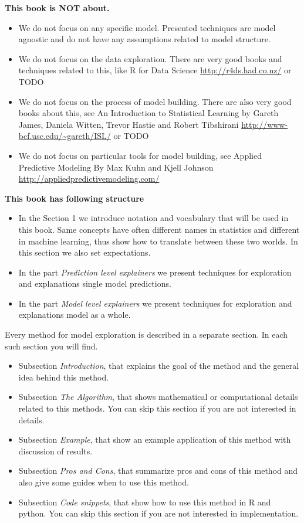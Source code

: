 \documentclass[]{krantz}
\providecommand{\tightlist}{%
  \setlength{\itemsep}{0pt}\setlength{\parskip}{0pt}}
\theoremstyle{definition}
\theoremstyle{definition}
\theoremstyle{definition}
\theoremstyle{remark}
\begin{document}
\textbf{This book is NOT about.}

\begin{itemize}
\tightlist
\item
  We do not focus on any specific model. Presented techniques are model
  agnostic and do not have any assumptions related to model structure.
\item
  We do not focus on the data exploration. There are very good books and
  techniques related to this, like R for Data Science
  \url{http://r4ds.had.co.nz/} or TODO
\item
  We do not focus on the process of model building. There are also very
  good books about this, see An Introduction to Statistical Learning by
  Gareth James, Daniela Witten, Trevor Hastie and Robert Tibshirani
  \url{http://www-bcf.usc.edu/~gareth/ISL/} or TODO
\item
  We do not focus on particular tools for model building, see Applied
  Predictive Modeling By Max Kuhn and Kjell Johnson
  \url{http://appliedpredictivemodeling.com/}
\end{itemize}

\textbf{This book has following structure}

\begin{itemize}
\tightlist
\item
  In the Section 1 we introduce notation and vocabulary that will be
  used in this book. Same concepts have often different names in
  statistics and different in machine learning, thus show how to
  translate between these two worlds. In this section we also set
  expectations.
\item
  In the part \emph{Prediction level explainers} we present techniques
  for exploration and explanations single model predictions.
\item
  In the part \emph{Model level explainers} we present techniques for
  exploration and explanations model as a whole.
\end{itemize}

Every method for model exploration is described in a separate section.
In each such section you will find.

\begin{itemize}
\tightlist
\item
  Subsection \emph{Introduction}, that explains the goal of the method
  and the general idea behind this method.
\item
  Subsection \emph{The Algorithm}, that shows mathematical or
  computational details related to this methods. You can skip this
  section if you are not interested in details.
\item
  Subsection \emph{Example}, that show an example application of this
  method with discussion of results.
\item
  Subsection \emph{Pros and Cons}, that summarize pros and cons of this
  method and also give some guides when to use this method.
\item
  Subsection \emph{Code snippets}, that show how to use this method in R
  and python. You can skip this section if you are not interested in
  implementation.
\end{itemize}
\end{document}
